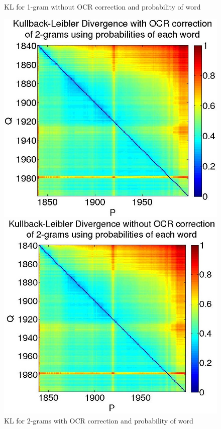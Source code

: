 \begin{figure}[H]
\begin{minipage}[b]{0.5\linewidth}
        \caption{KL for 1-gram without OCR correction and probability of word}
        \label{KL-PN1}
    \end{minipage}\hfill
\end{figure}

\begin{figure}[H]
    \begin{minipage}[b]{0.48\linewidth}
        \includegraphics[scale=0.25]{Pictures/kullback-leibler/KL_2-grams_with_correction_proba.jpg}
        \caption{KL for 2-grams with OCR correction and probability of word}
        \label{KL-PC2}
    \end{minipage}\hfill
    \begin{minipage}[b]{0.5\linewidth}
        \includegraphics[scale=0.25]{Pictures/kullback-leibler/KL_2-grams_without_correction_proba.jpg}

\end{minipage}
\end{figure}
